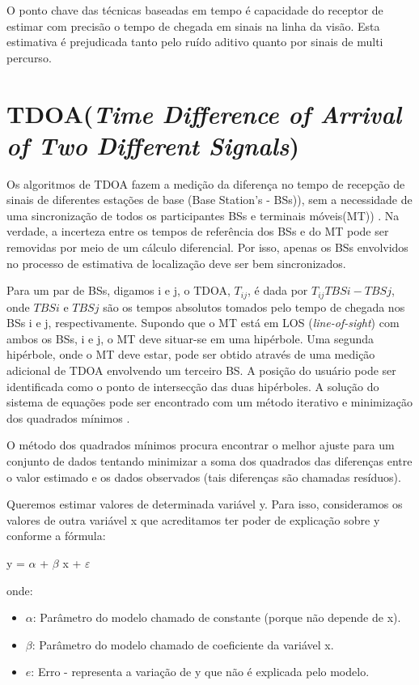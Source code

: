 O ponto chave das técnicas baseadas em tempo é capacidade do receptor de
estimar com precisão o tempo de chegada em sinais na linha da visão. Esta estimativa é prejudicada tanto pelo ruído 
aditivo quanto por sinais de multi percurso.

\section{TDOA(\textit{Time Difference of Arrival of Two Different Signals})}
  Os algoritmos de TDOA fazem a medição da diferença no tempo de recepção
de sinais de diferentes estações de base (Base Station's - BSs)), sem a necessidade de uma sincronização de
todos os participantes BSs e terminais móveis(MT)) \cite{tdoa}. Na verdade, a incerteza entre os tempos de referência
dos BSs e do MT pode ser removidas por meio de um cálculo diferencial. Por isso, apenas
os BSs envolvidos no processo de estimativa de localização deve ser bem sincronizados.

Para um par de BSs, digamos i e j, o TDOA,
$T_{ij}$, é dada por $T_{ij} TBSi - TBSj$, onde $TBSi$ e $TBSj$ são os tempos absolutos tomados 
pelo tempo de chegada nos BSs i e j, respectivamente. Supondo que o MT está em LOS (\textit{line-of-sight}) com ambos os BSs, i
e j, o MT deve situar-se em uma hipérbole. Uma segunda hipérbole, onde o
MT deve estar, pode ser obtido através de uma medição adicional de TDOA envolvendo
um terceiro BS. A posição do usuário pode ser identificada como o ponto de intersecção
das duas hipérboles. A solução do sistema de equações pode ser encontrado com um
método iterativo e minimização dos quadrados mínimos \cite{tdoa}.

O método dos quadrados mínimos procura encontrar 
o melhor ajuste para um conjunto de dados tentando minimizar a soma dos quadrados das diferenças 
entre o valor estimado e os dados observados (tais diferenças são chamadas resíduos).

Queremos estimar valores de determinada variável y. Para isso, consideramos os valores de outra variável x 
que acreditamos ter poder de explicação sobre y conforme a fórmula:

    y = $\alpha$ + $\beta$ x + $\varepsilon$

onde:
    \begin{itemize}
     \item $\alpha$: Parâmetro do modelo chamado de constante (porque não depende de x).
     \item  $\beta$: Parâmetro do modelo chamado de coeficiente da variável x.
     \item  $e$: Erro - representa a variação de y que não é explicada pelo modelo.
    \end{itemize}

